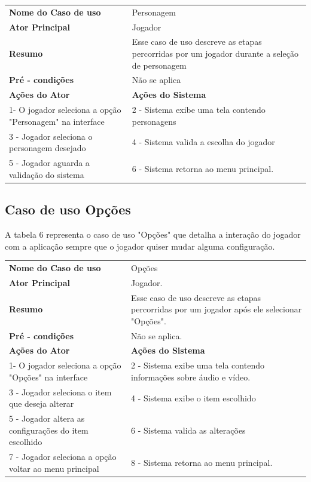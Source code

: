 \begin{table}[h!]
\centering 
{} 
\begin{tabular}{ | m{5cm} | m{8cm}| }  
\hline
\textbf {Nome do Caso de uso} & Personagem \\ 
\textbf {Ator Principal} & Jogador \\  
\textbf {Resumo} & Esse caso de uso descreve as etapas percorridas por um jogador durante a seleção de personagem \\ 
\textbf {Pré - condições} & Não se aplica\\ 
\hline 
\textbf {Ações do Ator} & \textbf {Ações do Sistema}\\ 
\hline 
1- O jogador seleciona a opção "Personagem" na interface & 2 - Sistema exibe uma tela contendo personagens\\
3 - Jogador seleciona o personagem desejado & 4 - Sistema valida a escolha do jogador\\
5 - Jogador aguarda a validação do sistema & 6 - Sistema retorna ao menu principal.\\
\hline 
\end{tabular} 
\end{table} 

\subsection{Caso de uso Opções} 
A tabela 6 representa o caso de uso "Opções" que detalha a interação do jogador com a aplicação sempre que o jogador quiser mudar alguma configuração. 

\begin{table}  [h!]
\centering 
{} 
\begin{tabular}{ | m{5cm} | m{8cm}| }  
\hline 
\textbf {Nome do Caso de uso} & Opções \\  
\textbf {Ator Principal} & Jogador. \\  
\textbf {Resumo} & Esse caso de uso descreve as etapas percorridas por um jogador após ele selecionar "Opções".\\ 
\textbf {Pré - condições} & Não se aplica.\\ 
\hline 
\textbf {Ações do Ator} & \textbf {Ações do Sistema}\\ 
\hline 
1- O jogador seleciona a opção "Opções" na interface & 2 - Sistema exibe uma tela contendo informações sobre áudio e vídeo.\\ 
3 - Jogador seleciona o item que deseja alterar & 4 - Sistema exibe o item escolhido\\
5 - Jogador altera as configurações do item escolhido & 6 - Sistema valida as alterações\\
7 - Jogador seleciona a opção voltar ao menu principal & 8 - Sistema retorna ao menu principal.\\
\hline 
\end{tabular} 
\end{table} 
 \pagebreak
 
